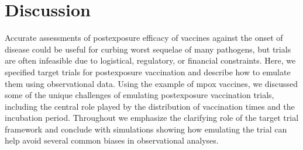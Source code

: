 \documentclass[11pt]{article}
\begin{document}





\section{Discussion} \label{sec:discussion}
Accurate assessments of postexposure efficacy of vaccines against the onset of disease could be useful for curbing worst sequelae of many pathogens, but trials are often infeasible due to logistical, regulatory, or financial constraints. Here, we specified target trials for postexposure vaccination and describe how to emulate them using observational data. Using the example of mpox vaccines, we discussed some of the unique challenges of emulating postexposure vaccination trials, including the central role played by the distribution of vaccination times and the incubation period. Throughout we emphasize the clarifying role of the target trial framework and conclude with simulations showing how emulating the trial can help avoid several common biases in observational analyses. 
\end{document}
